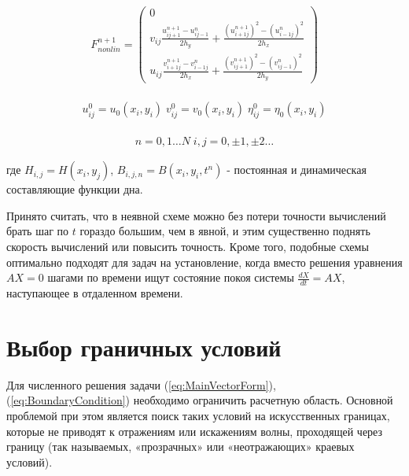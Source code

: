 \begin{eqnarray}
    \label{eq:ApproxFNonlin}
    F^{n+1}_{nonlin}=\begin{pmatrix}
	0\\
	v_{ij}\frac{u_{ij+1}^{n+1}-u_{ij-1}^{n}}{2h_y}+
	\frac{(u_{i+1j}^{n+1})^2-(u_{i-1j}^{n})^2}{2h_x}\\
	u_{ij}\frac{v_{i+1j}^{n+1}-v_{i-1j}^{n}}{2h_x}+
	\frac{(v_{ij+1}^{n+1})^2-(v_{ij-1}^{n})^2}{2h_y}
    \end{pmatrix}
\end{eqnarray}

\begin{gather}
    \begin{split}
	\label{eq:BeginValues}
	u_{ij}^0=u_0(x_i,y_i)\;
	v_{ij}^0=v_0(x_i,y_i)\;
	\eta_{ij}^0=\eta_0(x_i,y_i)
    \end{split}
\end{gather}

\begin{gather*}
    n=0,1 \ldots N \; i,j=0,\pm 1,\pm 2 \ldots
\end{gather*}

где $H_{i,j}=H(x_i,y_j)$, $B_{i,j,n}=B(x_i,y_i,t^n)$ - постоянная и динамическая составляющие функции дна.

Принято считать, что в неявной схеме можно без потери точности вычислений брать шаг по $t$ гораздо большим, чем в явной, и этим существенно поднять скорость вычислений или повысить точность. Кроме того, подобные схемы оптимально подходят для задач на установление, когда вместо решения уравнения $AX=0$ шагами по времени ищут состояние покоя системы $\frac{dX}{dt}=AX$, наступающее в отдаленном времени.

\newpage
\addtocounter{section}{1}
\setcounter{subsection}{0}
\setcounter{equation}{0}
\section*{Выбор граничных условий}

Для численного решения задачи (\ref{eq:MainVectorForm}), (\ref{eq:BoundaryCondition}) необходимо ограничить расчетную область. Основной проблемой при этом является поиск таких условий на искусственных границах, которые не приводят к отражениям или искажениям волны, проходящей через границу (так называемых, «прозрачных» или «неотражающих» краевых условий).

